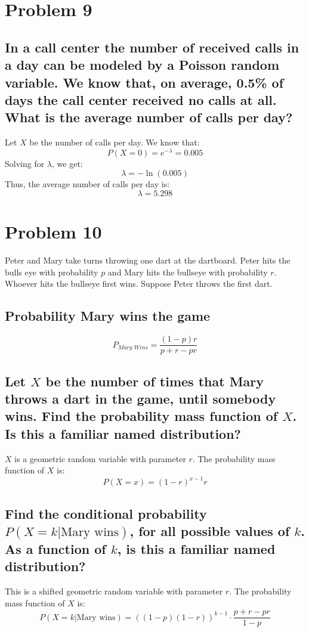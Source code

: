 \documentclass{article}
\theoremstyle{plain} %
\theoremstyle{definition} %
\begin{document}
\section*{Problem 9}
\subsection*{In a call center the number of received calls in a day
can be modeled by a Poisson random variable. We know that, on average, 0.5\% of days
the call center received no calls at all. What is the average number of calls per day?}
Let $X$ be the number of calls per day. We know that:
\[
    P(X=0) = e^{-\lambda} = 0.005
\]
Solving for $\lambda$, we get:
\[
    \lambda = -\ln(0.005)
\]
Thus, the average number of calls per day is:
\[
    \lambda = \boxed{5.298}
\]

\section*{Problem 10}
Peter and Mary take turns throwing one dart at
the dartboard. Peter hits the bulls eye with probability $p$ and Mary hits the bullseye
with probability $r$. Whoever hits the bullseye first wins. Suppose Peter throws the first
dart.
\subsection*{Probability Mary wins the game}
\[
    \boxed{P_{\textit{Mary Wins}} = \frac{(1-p)r}{p+r-pr}}
\]
\subsection*{Let $X$ be the number of times that Mary throws a dart in the game, until somebody wins. Find the probability mass function of $X$. Is this a familiar named
distribution?}
$X$ is a geometric random variable with parameter $r$.
The probability mass function of $X$ is:
\[
    \boxed{P(X=x) = (1-r)^{x-1}r}
\]

\subsection*{Find the conditional probability $P (X = k | \text{Mary wins})$, for all possible values of
$k$. As a function of $k$, is this a familiar named distribution?}
This is a shifted geometric random variable with parameter $r$.
The probability mass function of $X$ is:
\[
    \boxed{P(X=k|\text{Mary wins}) = ((1-p)(1-r))^{k-1}\cdot \frac{p+r-pr}{1-p}}
\]
\end{document}
